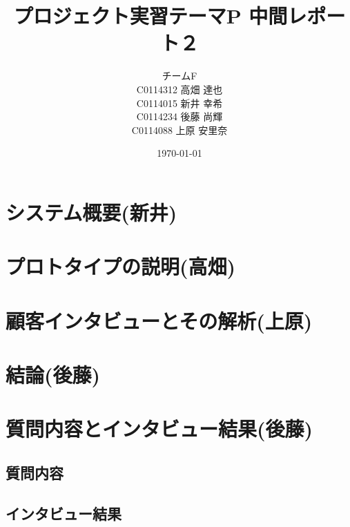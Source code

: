 \documentclass[a4paper,10pt,fleqn]{jsarticle}
\title{プロジェクト実習テーマP  中間レポート２}
\author{
  チームF　\\
  C0114312 高畑 達也\\
  C0114015 新井 幸希\\
  C0114234 後藤 尚輝\\
  C0114088 上原 安里奈\\
}
\date{\today}
\begin{document}
\maketitle

\section{システム概要(新井)}

\section{プロトタイプの説明(高畑)}

\section{顧客インタビューとその解析(上原)}

\section{結論(後藤)}


\section{質問内容とインタビュー結果(後藤)}

\subsection{質問内容}
\subsection{インタビュー結果}
\end{document}
